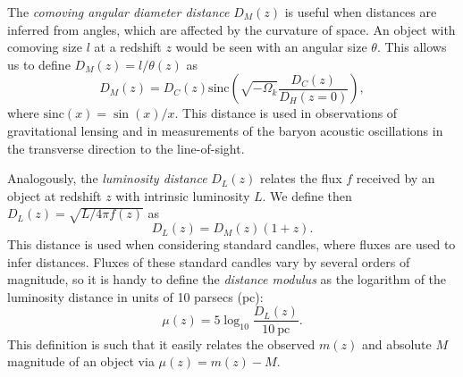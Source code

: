     The \emph{comoving angular diameter distance} $D_M(z)$ is useful when distances are inferred from 
    angles, which are affected by the curvature of space. 
    An object with comoving size $l$ at a redshift $z$ would be seen with an angular size $\theta$.
    This allows us to define $D_M(z) = l/\theta(z)$ as
    \begin{equation}
        D_M(z)  = D_C(z) \mathrm{sinc} \left(\sqrt{-\Omega_k} \frac{D_C(z)}{D_H(z=0)}\right),
        \label{eq:comoving_ang_diameter_distance}
    \end{equation}
    where $\mathrm{sinc}(x) = \sin(x)/x$. This distance is used in observations of 
    gravitational lensing and in measurements of the baryon acoustic oscillations 
    in the transverse direction to the line-of-sight. 
    
    Analogously, the \emph{luminosity distance} $D_L(z)$ 
    relates the flux $f$ received by an object at redshift $z$ with intrinsic luminosity $L$.
    We define then $D_L(z) = \sqrt{L/4\pi f(z)}$ as
    \begin{equation}
        D_L(z)  = D_M(z) (1+z).
        \label{eq:luminosity_distance}
    \end{equation}
    This distance is used when considering standard candles, where fluxes are used to infer 
    distances. 
    Fluxes of these standard candles vary by several orders of magnitude, 
    so it is handy to define the \emph{distance modulus} as the logarithm of the 
    luminosity distance in units of 10 parsecs (pc):
    \begin{equation}
        \mu(z) = 5\log_{10}\frac{D_L(z)}{10~\mathrm{pc}}.
        \label{eq:distance_modulus}
    \end{equation}
    This definition is such that it easily relates the observed $m(z)$ and absolute $M$ magnitude 
    of an object via $\mu(z) = m(z) - M$.

